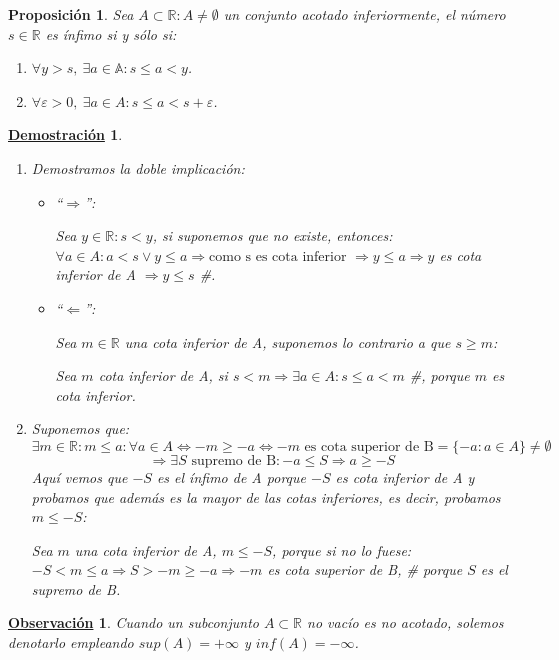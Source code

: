 \documentclass[10pt,a4paper,openright]{book}
\theoremstyle{break}
\newtheorem{prop}{Proposición}[chapter]
\newtheorem*{demo}{\underline{Demostración}}
\newtheorem{obs}{\underline{Observación}}[chapter]
\begin{document}
\begin{prop}
Sea $A\subset \mathbb R: A\neq \emptyset$ un conjunto acotado inferiormente, el número $s\in \mathbb R$ es ínfimo si y sólo si:
\begin{enumerate}
\item $\forall y> s, \ \exists a\in \mathbb A: s\leq a<y$.
\item $\forall \varepsilon>0, \ \exists a\in A: s\leq a<s+\varepsilon$.
\end{enumerate}
\end{prop}
\begin{demo}
\begin{enumerate}
\item Demostramos la doble implicación:
	\begin{itemize}
	\item ``$\Rightarrow$'':\par
	Sea $y\in \mathbb R: s<y$, si suponemos que no existe, entonces: $\forall a \in  A: a<s\vee y\leq a\Rightarrow\mbox{como s es cota inferior }\Rightarrow  y\leq a\Rightarrow y$ es cota inferior de A $\Rightarrow y\leq s$ \#.
	\item ``$\Leftarrow$'':\par
	Sea $m\in \mathbb R$ una cota inferior de A, suponemos lo contrario a que $s\geq m$:\par
	Sea $m$ cota inferior de A, si $s<m\Rightarrow \exists a\in A: s\leq a<m$ \#, porque $m$ es cota inferior.
	\end{itemize}
	
\item Suponemos que:
$$\exists m\in \mathbb R: m\leq a: \forall a\in A\Leftrightarrow -m\geq -a\Leftrightarrow -m\mbox{ es cota superior de B}=\{-a: a\in A\}\neq \emptyset$$
$$\Rightarrow \exists S\mbox{ supremo de B}: -a\leq S\Rightarrow a\geq -S$$
Aquí vemos que $-S$ es el ínfimo de A porque $-S$ es cota inferior de A y probamos que además es la mayor de las cotas inferiores, es decir, probamos $m\leq -S$:\par
Sea $m$ una cota inferior de A, $m\leq -S$, porque si no lo fuese:
$-S<m\leq a\Rightarrow S>-m\geq -a\Rightarrow -m$ es cota superior de B, \# porque $S$ es el supremo de B.
\end{enumerate}
\end{demo}

\begin{obs}
Cuando un subconjunto $A\subset \mathbb R$ no vacío es no acotado, solemos denotarlo empleando $sup(A)=+\infty$ y $inf(A)=-\infty$.
\end{obs}
\end{document}
